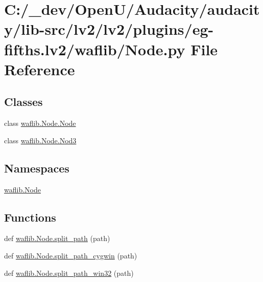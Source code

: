 \hypertarget{lv2_2plugins_2eg-fifths_8lv2_2waflib_2_node_8py}{}\section{C\+:/\+\_\+dev/\+Open\+U/\+Audacity/audacity/lib-\/src/lv2/lv2/plugins/eg-\/fifths.lv2/waflib/\+Node.py File Reference}
\label{lv2_2plugins_2eg-fifths_8lv2_2waflib_2_node_8py}
\subsection*{Classes}
\begin{DoxyCompactItemize}
\item 
class \hyperlink{classwaflib_1_1_node_1_1_node}{waflib.\+Node.\+Node}
\item 
class \hyperlink{classwaflib_1_1_node_1_1_nod3}{waflib.\+Node.\+Nod3}
\end{DoxyCompactItemize}
\subsection*{Namespaces}
\begin{DoxyCompactItemize}
\item 
 \hyperlink{namespacewaflib_1_1_node}{waflib.\+Node}
\end{DoxyCompactItemize}
\subsection*{Functions}
\begin{DoxyCompactItemize}
\item 
def \hyperlink{namespacewaflib_1_1_node_ae580a314d04691a283552a4712b56a84}{waflib.\+Node.\+split\+\_\+path} (path)
\item 
def \hyperlink{namespacewaflib_1_1_node_a089fc378e3863231aab10b6892a9bc2b}{waflib.\+Node.\+split\+\_\+path\+\_\+cygwin} (path)
\item 
def \hyperlink{namespacewaflib_1_1_node_a20acd7540bbb7886232accfe0a2a4219}{waflib.\+Node.\+split\+\_\+path\+\_\+win32} (path)
\end{DoxyCompactItemize}
